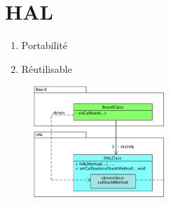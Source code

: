 \documentclass[resume]{subfiles}
\begin{document}
\section{HAL}
\begin{enumerate}
\item Portabilité
\item Réutilisable
\end{enumerate}
\begin{figure}[H]
\centering
\includegraphics[width=5.00cm]{img_10.png}
\end{figure}
\end{document}
